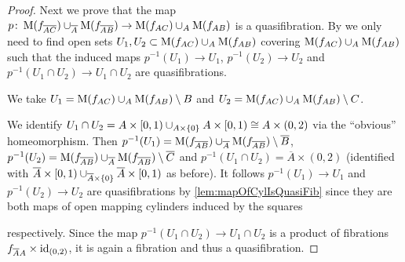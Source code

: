 \begin{prop}
\begin{proof}
        Next we prove that the map $p\colon\operatorname{M}(f_{\overline{A}\overline{C}})\cup_{\overline{A}}\operatorname{M}(f_{\overline{A}\overline{B}})\to\operatorname{M}(f_{AC})\cup_A\operatorname{M}(f_{AB})$ is a quasifibration.
        By \cite[Lemma 4K.3]{hatcher2002algebraic} we only need to find open sets $U_1,U_2\subset\operatorname{M}(f_{AC})\cup_A\operatorname{M}(f_{AB})$ covering $\operatorname{M}(f_{AC})\cup_A\operatorname{M}(f_{AB})$ such that the induced maps $p^{-1}(U_1)\to U_1$, $p^{-1}(U_2)\to U_2$ and $p^{-1}(U_1\cap U_2)\to U_1\cap U_2$ are quasifibrations.

        We take $U_1=\operatorname{M}(f_{AC})\cup_A\operatorname{M}(f_{AB})\setminus{B}$ and $U_2=\operatorname{M}(f_{AC})\cup_A\operatorname{M}(f_{AB})\setminus{C}$. 

        We identify $U_1\cap U_2=A\times [0,1)\cup_{A\times\left\lbrace0\right\rbrace} A\times[0,1)\cong A\times (0,2)$ via the ``obvious'' homeomorphism. %
        Then $p^{-1}(U_1)=\operatorname{M}(f_{\overline{A}\overline{B}})\cup_{\overline{A}}\operatorname{M}(f_{\overline{A}\overline{B}})\setminus{\overline{B}}$, $p^{-1}(U_2)=\operatorname{M}(f_{\overline{A}\overline{B}})\cup_{\overline{A}}\operatorname{M}(f_{\overline{A}\overline{B}})\setminus{\overline{C}}$ and $p^{-1}(U_1\cap U_2)=\overline{A}\times (0,2)$ (identified with $\overline{A}\times [0,1)\cup_{\overline{A}\times\left\lbrace0\right\rbrace} \overline{A}\times[0,1)$ as before).
        It follows $p^{-1}(U_1)\to U_1$ and $p^{-1}(U_2)\to U_2$ are quasifibrations by \cref{lem:mapOfCylIsQuasiFib} since they are both maps of open mapping cylinders induced by the squares 
        \begin{center}
        \end{center}
        respectively.
        Since the map $p^{-1}(U_1\cap U_2)\to U_1\cap U_2$ is a product of fibrations $f_{\overline{A}A}\times\text{id}_{(0,2)}$, it is again a fibration and thus a quasifibration.


\end{proof}
\end{prop}
